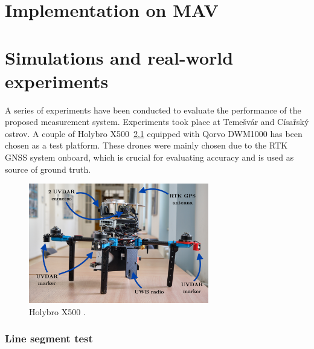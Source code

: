 \documentclass[twoside]{ctustyle/ctuthesis}
\theoremstyle{plain}
\theoremstyle{definition}
\theoremstyle{note}
\begin{document}

\hypertarget{implementation-on-mav}{%
\chapter{Implementation on MAV}\label{implementation-on-mav}}


\hypertarget{simulations-and-real-world-experiments}{%
\chapter{Simulations and real-world
experiments}\label{simulations-and-real-world-experiments}}

A series of experiments have been conducted to evaluate the performance
of the proposed measurement system. Experiments took place at Temešvár
and Císařský ostrov. A couple of Holybro X500~\ref{fig-holybrox500}
equipped with Qorvo DWM1000 has been chosen as a test platform. These
drones were mainly chosen due to the RTK GNSS system onboard, which is
crucial for evaluating accuracy and is used as source of ground truth.

\begin{figure}

{\centering \includegraphics[width=0.7\textwidth,height=\textheight]{chapters/images/holybrox500.jpg}

}

\caption[\label{fig-holybrox500}Holybro X500 .]{\label{fig-holybrox500}Holybro X500 \footnotemark{}.}

\end{figure}

\hypertarget{line-segment-test}{%
\subsection{Line segment test}\label{line-segment-test}}
\end{document}
